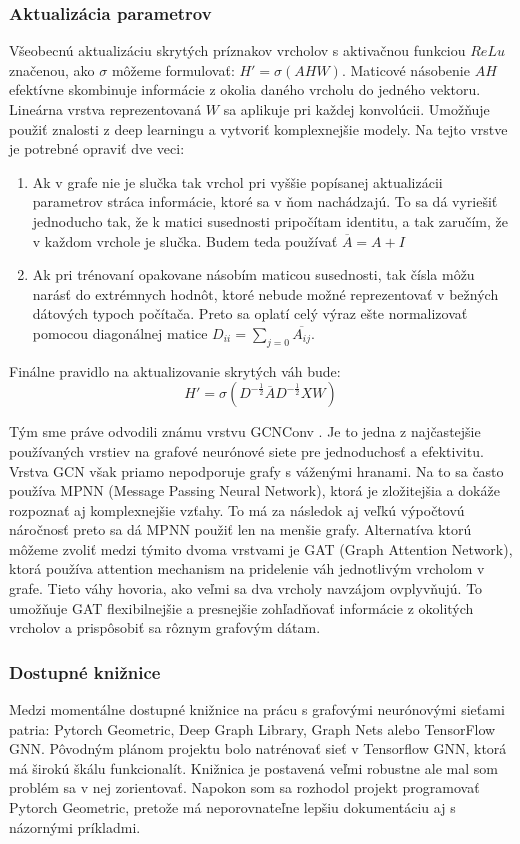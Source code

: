 \documentclass{article}
\begin{document}
\subsubsection*{Aktualizácia parametrov}
Všeobecnú aktualizáciu skrytých príznakov vrcholov s aktivačnou funkciou $ReLu$ značenou, ako $\sigma$ môžeme formulovať: $H' = \sigma(AHW)$. Maticové násobenie $AH$ efektívne skombinuje informácie z okolia daného vrcholu do jedného vektoru. Lineárna vrstva reprezentovaná $W$ sa aplikuje pri každej konvolúcii. Umožňuje použiť znalosti z deep learningu a vytvoriť komplexnejšie modely. Na tejto vrstve je potrebné opraviť dve veci:
\begin{enumerate}
    \item Ak v grafe nie je slučka tak vrchol pri vyššie popísanej aktualizácii parametrov stráca informácie, ktoré sa v ňom nachádzajú. To sa dá vyriešiť jednoducho tak, že k matici susednosti pripočítam identitu, a tak zaručím, že v každom vrchole je slučka. Budem teda používať $\overline{A} = A + I$
    \item Ak pri trénovaní opakovane násobím maticou susednosti, tak čísla môžu narásť do extrémnych hodnôt, ktoré nebude možné reprezentovať v bežných dátových typoch počítača. Preto sa oplatí celý výraz ešte normalizovať pomocou diagonálnej matice $D_{ii} = \sum_{j=0} \overline{A_{ij}}$.
\end{enumerate}

Finálne pravidlo na aktualizovanie skrytých váh bude:
$$H' = \sigma(D^{-\frac{1}{2}} \overline{A} D^{-\frac{1}{2}} XW) $$

Tým sme práve odvodili známu vrstvu GCNConv \cite{GCN}. Je to jedna z najčastejšie používaných vrstiev na grafové neurónové siete pre jednoduchosť a efektivitu. Vrstva GCN však priamo nepodporuje grafy s váženými hranami. Na to sa často používa MPNN (Message Passing Neural Network), ktorá je zložitejšia a dokáže rozpoznať aj komplexnejšie vzťahy. To má za následok aj veľkú výpočtovú náročnosť preto sa dá MPNN použiť len na menšie grafy. Alternatíva ktorú môžeme zvoliť medzi týmito dvoma vrstvami je GAT (Graph Attention Network), ktorá používa attention mechanism na pridelenie váh jednotlivým vrcholom v grafe. Tieto váhy hovoria, ako veľmi sa dva vrcholy navzájom ovplyvňujú. To umožňuje GAT flexibilnejšie a presnejšie zohľadňovať informácie z okolitých vrcholov a prispôsobiť sa rôznym grafovým dátam. \cite{GAT}


\subsubsection*{Dostupné knižnice}
Medzi momentálne dostupné knižnice na prácu s grafovými neurónovými sieťami patria: Pytorch Geometric, Deep Graph Library, Graph Nets alebo TensorFlow GNN. Pôvodným plánom projektu bolo natrénovať sieť v Tensorflow GNN, ktorá má širokú škálu funkcionalít. Knižnica je postavená veľmi robustne ale mal som problém sa v nej zorientovať. Napokon som sa rozhodol projekt programovať Pytorch Geometric, pretože má neporovnateľne lepšiu dokumentáciu aj s názornými príkladmi.
\end{document}
